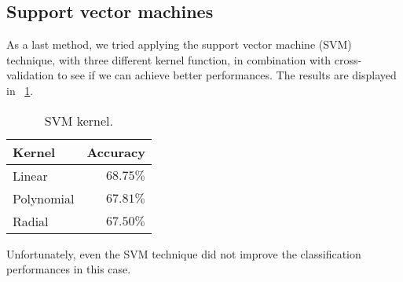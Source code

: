 \subsection{Support vector machines}

As a last method, we tried applying the support vector machine (SVM) technique, with three different kernel function, in combination with cross-validation to see if we can achieve better performances. The results are displayed in \Tab~\ref{table:SVMkernels}.

\begin{table}[H]
	\centering
	\begin{tabular}{|| l | r ||} 
		\hline
		Kernel & Accuracy \\
		\hline
		Linear & $68.75\%$ \\
		\hline
		Polynomial & $67.81\%$ \\
		\hline
		Radial & $67.50\%$ \\
		\hline
	\end{tabular}
	\caption{SVM kernel.}
	\label{table:SVMkernels}
\end{table} 

Unfortunately, even the SVM technique did not improve the classification performances in this case. 